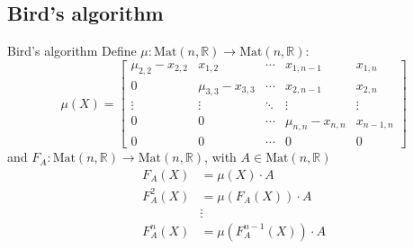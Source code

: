 \documentclass{beamer}
\begin{document}
\subsection{Bird's algorithm}

\begin{frame}{Bird's algorithm}
    Define $\mu : \mathrm{Mat}(n, \mathbb{R}) \to \mathrm{Mat}(n, \mathbb{R})$:
    \[
        \mu(X) =
        \begin{bmatrix}{}
            \mu_{2,2} - x_{2,2} & x_{1,2}             & \cdots & x_{1,n-1}           & x_{1,n} \\
            0                   & \mu_{3,3} - x_{3,3} & \cdots & x_{2,n-1}           & x_{2,n} \\
            \vdots              & \vdots              & \ddots & \vdots              & \vdots \\
            0                   & 0                   & \cdots & \mu_{n,n} - x_{n,n} & x_{n-1,n} \\
            0                   & 0                   & \cdots & 0                   & 0
        \end{bmatrix}
    \]
    and $F_A : \mathrm{Mat}(n, \mathbb{R}) \to \mathrm{Mat}(n, \mathbb{R})$,
    with $A \in \mathrm{Mat}(n, \mathbb{R})$
    \begin{align*}{}
        F_A(X)    & = \mu(X)\cdot A \\
        F_A^2(X)  & = \mu(F_A(X)) \cdot A \\
                  & \vdots \\
        F_A^n(X)  & = \mu(F_A^{n-1}(X)) \cdot A \\
    \end{align*}

\end{frame}
\end{document}
